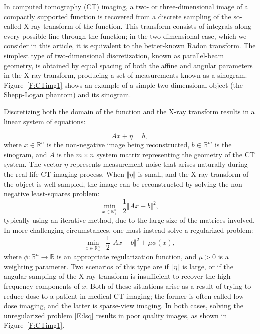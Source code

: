 \documentclass[]{interact}
\newcommand{\Real}{\mathbb{R}}
\theoremstyle{plain}%
\theoremstyle{definition}
\theoremstyle{remark}
\begin{document}
In computed tomography (CT) imaging, a two- or three-dimensional image of a compactly supported function is recovered from a discrete sampling of the so-called X-ray transform of the function. This transform consists of integrals along every possible line through the function; in the two-dimensional case, which we consider in this article, it is equivalent to the better-known Radon transform. The simplest type of two-dimensional discretization, known as parallel-beam geometry, is obtained by equal spacing of both the affine and angular parameters in the X-ray transform, producing a set of measurements known as a sinogram. Figure~\ref{F:CTimg1} shows an example of a simple two-dimensional object (the Shepp-Logan phantom) and its sinogram.

Discretizing both the domain of the function and the X-ray transform results in a linear system of equations:

\begin{equation}
Ax + \eta = b,
\end{equation}
where $x\in\Real^{n}$ is the non-negative image being reconstructed, $b \in \Real^m$ is the sinogram, and $A$ is the $m \times n$ system matrix representing the geometry of the CT system. The vector $\eta$ represents measurement noise that arises naturally during the real-life CT imaging process. When $\Vert \eta \Vert$ is small, and the X-ray transform of the object is well-sampled, the image can be reconstructed by solving the non-negative least-squares problem:
\begin{equation}
\min_{x\in\Real^{n}_+}~~\frac{1}{2} \Vert Ax - b \Vert^2, \label{E:lsq}
\end{equation}
typically using an iterative method, due to the large size of the matrices involved. In more challenging circumstances, one must instead solve a regularized problem:
\begin{equation}
\min_{x\in\Real^{n}_+}~~\frac{1}{2} \Vert Ax - b \Vert^2 + \mu \phi(x),\label{E:lsqreg}
\end{equation}
where $\phi: \Real^n \to \Real$ is an appropriate regularization function, and $\mu > 0$ is a weighting parameter. Two scenarios of this type are if $\Vert \eta \Vert$ is large, or if the angular sampling of the X-ray transform is insufficient to recover the high-frequency components of $x$. Both of these situations arise as a result of trying to reduce dose to a patient in medical CT imaging; the former is often called low-dose imaging, and the latter is sparse-view imaging. In both cases, solving the unregularized problem \eqref{E:lsq} results in poor quality images, as shown in Figure~\ref{F:CTimg1}.
\end{document}
